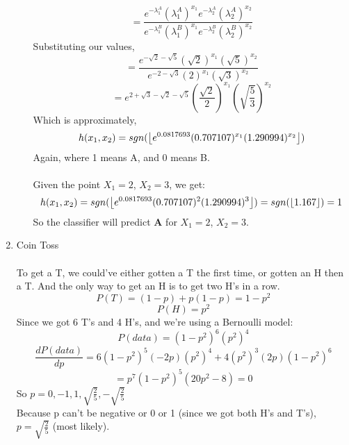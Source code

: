 \begin{enumerate}
\begin{enumerate}
    $$=\frac{e^{-\lambda_1^A}(\lambda_1^A)^{x_1}e^{-\lambda_2^A}(\lambda_2^A)^{x_2}}{e^{-\lambda_1^B}(\lambda_1^B)^{x_1}e^{-\lambda_2^B}(\lambda_2^B)^{x_2}}$$
    Substituting our values,
    $$=\frac{e^{-\sqrt{2}-\sqrt{5}}(\sqrt{2})^{x_1}(\sqrt{5})^{x_2}}{e^{-2-\sqrt{3}}(2)^{x_1}(\sqrt{3})^{x_2}}$$
    $$=e^{2 + \sqrt{3}-\sqrt{2}-\sqrt{5}}(\frac{\sqrt{2}}{2})^{x_1}(\sqrt{\frac{5}{3}})^{x_2}$$
    Which is approximately,
    $$h(x_1,x_2)=sgn(\floor*{e^{0.0817693}(0.707107)^{x_1}(1.290994)^{x_2}})$$
    Again, where 1 means A, and 0 means B.\\\\
    Given the point $X_1=2$, $X_2=3$, we get:
    $$h(x_1,x_2)=sgn(\floor*{e^{0.0817693}(0.707107)^{2}(1.290994)^{3}})=sgn(\floor*{1.167})=1$$
    So the classifier will predict \textbf{A} for $X_1=2$, $X_2=3$.
  \end{enumerate}
  \item Coin Toss\\\\
    To get a T, we could've either gotten a T the first time, or gotten an H then a T. And the only way to get an H is to get two H's in a row.
    $$P(T) = (1-p) + p(1-p) = 1-p^2$$
    $$P(H) = p^2$$
    Since we got 6 T's and 4 H's, and we're using a Bernoulli model:
    $$P(data) = (1-p^2)^6 (p^2)^4$$
    $$\frac{dP(data)}{dp} = 6(1-p^2)^5 (-2p)(p^2)^4 + 4(p^2)^3 (2p)(1-p^2)^6$$    
    $$=p^7(1-p^2)^5 (20p^2-8) = 0$$
    So $p=0,-1,1,\sqrt{\frac{2}{5}}, -\sqrt{\frac{2}{5}}$\\
    Because p can't be negative or 0 or 1 (since we got both H's and T's), $p=\sqrt{\frac{2}{5}}$ (most likely).
\end{enumerate}


